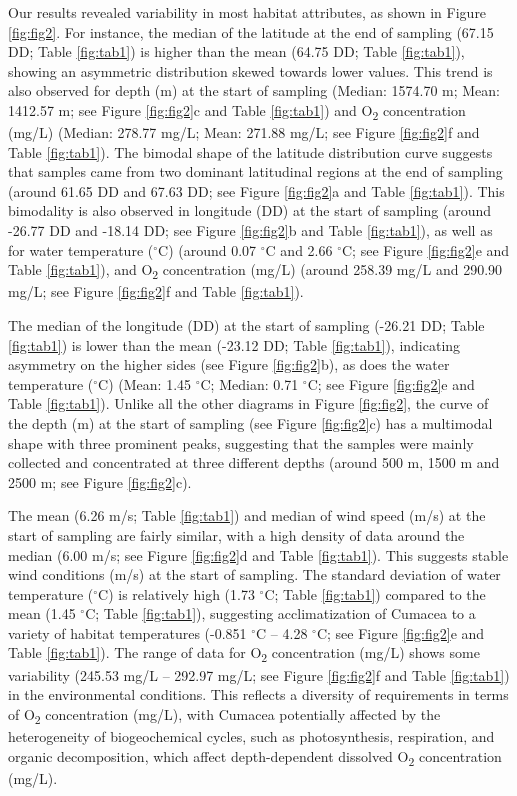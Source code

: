 {Our results revealed variability in most habitat attributes, as shown in Figure \ref{fig:fig2}. For instance, the median of the latitude at the end of sampling (67.15 DD; Table \ref{fig:tab1}) is higher than the mean (64.75 DD; Table \ref{fig:tab1}), showing an asymmetric distribution skewed towards lower values. This trend is also observed for depth (m) at the start of sampling (Median: 1574.70 m; Mean: 1412.57 m; see Figure \ref{fig:fig2}c and Table \ref{fig:tab1}) and O\textsubscript{2} concentration (mg/L) (Median: 278.77 mg/L; Mean: 271.88 mg/L; see Figure \ref{fig:fig2}f and Table \ref{fig:tab1}). The bimodal shape of the latitude distribution curve suggests that samples came from two dominant latitudinal regions at the end of sampling (around 61.65 DD and 67.63 DD; see Figure \ref{fig:fig2}a and Table \ref{fig:tab1}). This bimodality is also observed in longitude (DD) at the start of sampling (around -26.77 DD and -18.14 DD; see Figure \ref{fig:fig2}b and Table \ref{fig:tab1}), as well as for water temperature ($^\circ$C) (around 0.07 $^\circ$C and 2.66 $^\circ$C; see Figure \ref{fig:fig2}e and Table \ref{fig:tab1}), and O\textsubscript{2} concentration (mg/L) (around 258.39 mg/L and 290.90 mg/L; see Figure \ref{fig:fig2}f and Table \ref{fig:tab1}).

The median of the longitude (DD) at the start of sampling (-26.21 DD; Table \ref{fig:tab1}) is lower than the mean (-23.12 DD; Table \ref{fig:tab1}), indicating asymmetry on the higher sides (see Figure \ref{fig:fig2}b), as does the water temperature ($^\circ$C) (Mean: 1.45 $^\circ$C; Median: 0.71 $^\circ$C; see Figure \ref{fig:fig2}e and Table \ref{fig:tab1}). Unlike all the other diagrams in Figure \ref{fig:fig2}, the curve of the depth (m) at the start of sampling (see Figure \ref{fig:fig2}c) has a multimodal shape with three prominent peaks, suggesting that the samples were mainly collected and concentrated at three different depths (around 500 m, 1500 m and 2500 m; see Figure \ref{fig:fig2}c).

The mean (6.26 m/s; Table \ref{fig:tab1}) and median of wind speed (m/s) at the start of sampling are fairly similar, with a high density of data around the median (6.00 m/s; see Figure \ref{fig:fig2}d and Table \ref{fig:tab1}). This suggests stable wind conditions (m/s) at the start of sampling. The standard deviation of water temperature ($^\circ$C) is relatively high (1.73 $^\circ$C; Table \ref{fig:tab1}) compared to the mean (1.45 $^\circ$C; Table \ref{fig:tab1}), suggesting acclimatization of Cumacea to a variety of habitat temperatures (-0.851 $^\circ$C – 4.28 $^\circ$C; see Figure \ref{fig:fig2}e and Table \ref{fig:tab1}). The range of data for O\textsubscript{2} concentration (mg/L) shows some variability (245.53 mg/L – 292.97 mg/L; see Figure \ref{fig:fig2}f and Table \ref{fig:tab1}) in the environmental conditions. This reflects a diversity of requirements in terms of O\textsubscript{2} concentration (mg/L), with Cumacea potentially affected by the heterogeneity of biogeochemical cycles, such as photosynthesis, respiration, and organic decomposition, which affect depth-dependent dissolved O\textsubscript{2} concentration (mg/L).

}
